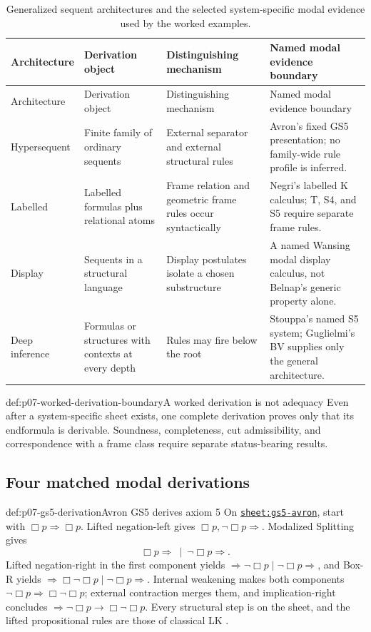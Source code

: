 \begingroup\small
\begin{longtable}{@{}p{}p{}p{}p{}@{}}
\caption{Generalized sequent architectures and the selected system-specific
  modal evidence used by the worked examples.}
\label{tab:p07-generalized-frameworks}\\
\toprule
Architecture & Derivation object & Distinguishing mechanism & Named modal evidence boundary \\
\midrule
\endfirsthead
\toprule
Architecture & Derivation object & Distinguishing mechanism & Named modal evidence boundary \\
\midrule
\endhead
Hypersequent & Finite family of ordinary sequents & External separator and external structural rules & Avron's fixed GS5 presentation; no family-wide rule profile is inferred. \\
\addlinespace
Labelled & Labelled formulas plus relational atoms & Frame relation and geometric frame rules occur syntactically & Negri's labelled K calculus; T, S4, and S5 require separate frame rules. \\
\addlinespace
Display & Sequents in a structural language & Display postulates isolate a chosen substructure & A named Wansing modal display calculus, not Belnap's generic property alone. \\
\addlinespace
Deep inference & Formulas or structures with contexts at every depth & Rules may fire below the root & Stouppa's named S5 system; Guglielmi's BV supplies only the general architecture. \\
\bottomrule
\end{longtable}
\endgroup

\begin{hbwarning}{def:p07-worked-derivation-boundary}{A worked derivation is not adequacy}
Even after a system-specific sheet exists, one complete derivation proves only
that its endformula is derivable.  Soundness, completeness, cut admissibility,
and correspondence with a frame class require separate status-bearing
results.
\end{hbwarning}

\subsection*{Four matched modal derivations}

\begin{hbexample}{def:p07-gs5-derivation}{Avron GS5 derives axiom 5}
On \hyperref[sheet:gs5-avron]{\texttt{sheet:gs5-avron}}, start with
\(\Box p\Rightarrow\Box p\). Lifted negation-left gives
\(\Box p,\neg\Box p\Rightarrow\). Modalized Splitting gives
\[
 \Box p\Rightarrow\ \mid\ \neg\Box p\Rightarrow.
\]
Lifted negation-right in the first component yields
\(\Rightarrow\neg\Box p\mid\neg\Box p\Rightarrow\), and Box-R yields
\(\Rightarrow\Box\neg\Box p\mid\neg\Box p\Rightarrow\).
Internal weakening makes both components
\(\neg\Box p\Rightarrow\Box\neg\Box p\); external contraction merges them,
and implication-right concludes
\(\Rightarrow\neg\Box p\to\Box\neg\Box p\). Every structural step is on the
sheet, and the lifted propositional rules are those of classical LK
\cite{Avron1996}.
\end{hbexample}

